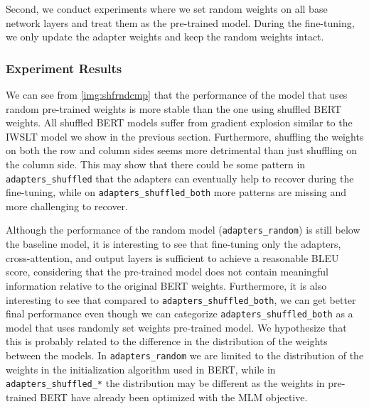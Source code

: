 Second, we conduct experiments where we set random weights on all base network layers and treat them as the pre-trained model. During the fine-tuning, we only update the adapter weights and keep the random weights intact.

\subsubsection{Experiment Results}
We can see from \cref{img:shfrndcmp} that the performance of the model that uses random pre-trained weights is more stable than the one using shuffled BERT weights. All shuffled BERT models suffer from gradient explosion similar to the IWSLT model we show in the previous section. Furthermore, shuffling the weights on both the row and column sides seems more detrimental than just shuffling on the column side. This may show that there could be some pattern in \texttt{adapters\_shuffled} that the adapters can eventually help to recover during the fine-tuning, while on \texttt{adapters\_shuffled\_both} more patterns are missing and more challenging to recover.

Although the performance of the random model (\texttt{adapters\_random}) is still below the baseline model, it is interesting to see that fine-tuning only the adapters, cross-attention, and output layers is sufficient to achieve a reasonable BLEU score, considering that the pre-trained model does not contain meaningful information relative to the original BERT weights. Furthermore, it is also interesting to see that compared to \texttt{adapters\_shuffled\_both}, we can get better final performance even though we can categorize \texttt{adapters\_shuffled\_both} as a model that uses randomly set weights pre-trained model. We hypothesize that this is probably related to the difference in the distribution of the weights between the models. In \texttt{adapters\_random} we are limited to the distribution of the weights in the initialization algorithm used in BERT, while in \texttt{adapters\_shuffled\_*} the distribution may be different as the weights in pre-trained BERT have already been optimized with the MLM objective.

